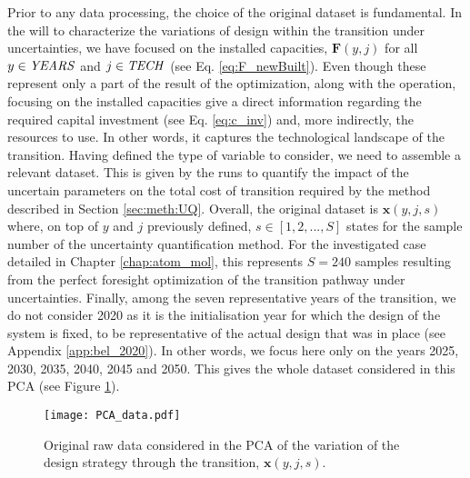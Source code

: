 \noindent
Prior to any data processing, the choice of the original dataset is fundamental. In the will to characterize the variations of design within the transition under uncertainties, we have focused on the installed capacities, $\textbf{F}(y,j)$ for all $y \in \text{\emph{YEARS}}$ and $j \in \text{\emph{TECH}}$ (see Eq. \ref{eq:F_newBuilt}). Even though these represent only a part of the result of the optimization, along with the operation, focusing on the installed capacities give a direct information regarding the required capital investment (see Eq. \ref{eq:c_inv}) and, more indirectly, the resources to use.  In other words, it captures the technological landscape of the transition.  Having defined the type of variable to consider, we need to assemble a relevant dataset. This is given by the runs to quantify the impact of the uncertain parameters on the total cost of transition required by the method described in Section \ref{sec:meth:UQ}. Overall, the original dataset is $\textbf{x}(y,j,s)$ where, on top of $y$ and $j$ previously defined, $s \in [1,2,...,S]$ states for the sample number of the uncertainty quantification method. For the investigated case detailed in Chapter \ref{chap:atom_mol}, this represents $S=240$ samples resulting from the perfect foresight optimization of the transition pathway under uncertainties. Finally, among the seven representative years of the transition, we do not consider 2020 as it is the initialisation year for which the design of the system is fixed, to be representative of the actual design that was in place (see Appendix \ref{app:bel_2020}). In other words, we focus here only on the years 2025, 2030, 2035, 2040, 2045 and 2050. This gives the whole dataset considered in this \gls{PCA} (see Figure \ref{fig:PCA_data}).\\

\begin{figure}[!htbp]
\centering
\texttt{[image: PCA\_data.pdf]}
\caption{Original raw data considered in the \acrfull{PCA} of the variation of the design strategy through the transition, $\textbf{x}(y,j,s)$.}
\label{fig:PCA_data}
\end{figure}

\\

